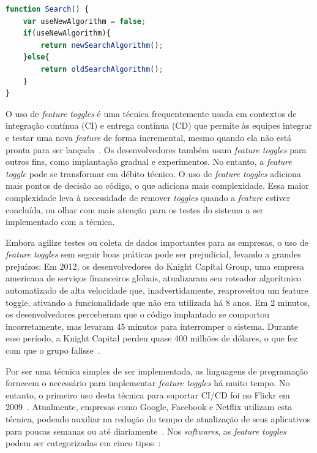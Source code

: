 \documentclass[portugues]{ic-tese}
\begin{document}
\begin{lstlisting}[language=JavaScript, label={code:makeFeatureToggle}, caption=Implementação de uma \textit{Feature Toggle}~\citep{Mahdavi-hezaveh_2021}]
function Search() {
    var useNewAlgorithm = false;
    if(useNewAlgorithm){
        return newSearchAlgorithm();
    }else{
        return oldSearchAlgorithm();
    }
}
\end{lstlisting}

O uso de \textit{feature toggles} é uma técnica frequentemente usada em contextos de integração contínua (CI) e entrega contínua (CD) que permite às equipes integrar e testar uma nova \textit{feature} de forma incremental, mesmo quando ela não está pronta para ser lançada~\citep{Mahdavi-hezaveh_2021}. Os desenvolvedores também usam \textit{feature toggles} para outros fins, como implantação gradual e experimentos. No entanto, a \textit{feature toggle} pode se transformar em débito técnico. O uso de \textit{feature toggles} adiciona mais pontos de decisão ao código, o que adiciona mais complexidade. Essa maior complexidade leva à necessidade de remover \textit{toggles} quando a \textit{feature} estiver concluída, ou olhar com mais atenção para os testes do sistema a ser implementado com a técnica.

Embora agilize testes ou coleta de dados importantes para as empresas, o uso de \textit{feature toggles} sem seguir boas práticas pode ser prejudicial, levando a grandes prejuízos: Em 2012, os desenvolvedores do Knight Capital Group, uma empresa americana de serviços financeiros globais, atualizaram seu roteador algorítmico automatizado de alta velocidade que, inadvertidamente, reaproveitou um feature toggle, ativando a funcionalidade que não era utilizada há 8 anos. Em 2 minutos, os desenvolvedores perceberam que o código implantado se comportou incorretamente, mas levaram 45 minutos para interromper o sistema. Durante esse período, a Knight Capital perdeu quase 400 milhões de dólares, o que fez com que o grupo falisse~\citep{Mahdavi-hezaveh_2021}. 

Por ser uma técnica simples de ser implementada, as linguagens de programação fornecem o necessário para implementar \textit{feature toggles} há muito tempo. No entanto, o primeiro uso desta técnica para suportar CI/CD foi no Flickr em 2009~\citep{Mahdavi-hezaveh_2021}. Atualmente, empresas como Google, Facebook e Netflix utilizam esta técnica, podendo auxiliar na redução do tempo de atualização de seus aplicativos para poucas semanas ou até diariamente~\citep{Rahman_2016}. Nos \textit{softwares}, as \textit{feature toggles} podem ser categorizadas em cinco tipos~\citep{Mahdavi-hezaveh_2021}:
\end{document}
